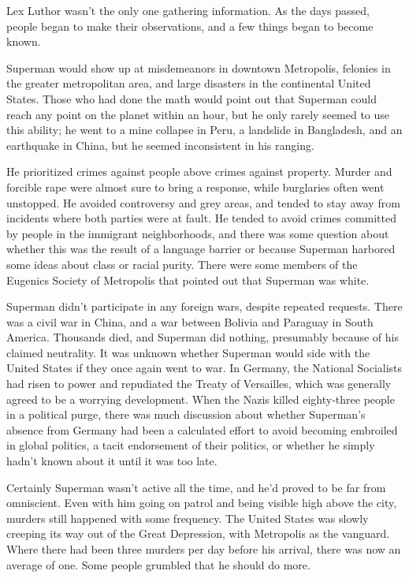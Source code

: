 \documentclass[ebook,12pt]{memoir}
\begin{document}
Lex Luthor wasn't the only one gathering information. As the days
passed, people began to make their observations, and a few things began
to become known.

Superman would show up at misdemeanors in downtown Metropolis, felonies
in the greater metropolitan area, and large disasters in the continental
United States. Those who had done the math would point out that Superman
could reach any point on the planet within an hour, but he only rarely
seemed to use this ability; he went to a mine collapse in Peru, a
landslide in Bangladesh, and an earthquake in China, but he seemed
inconsistent in his ranging.

He prioritized crimes against people above crimes against property.
Murder and forcible rape were almost sure to bring a response, while
burglaries often went unstopped. He avoided controversy and grey areas,
and tended to stay away from incidents where both parties were at fault.
He tended to avoid crimes committed by people in the immigrant
neighborhoods, and there was some question about whether this was the
result of a language barrier or because Superman harbored some ideas
about class or racial purity. There were some members of the Eugenics
Society of Metropolis that pointed out that Superman was white.

Superman didn't participate in any foreign wars, despite repeated
requests. There was a civil war in China, and a war between Bolivia and
Paraguay in South America. Thousands died, and Superman did nothing,
presumably because of his claimed neutrality. It was unknown whether
Superman would side with the United States if they once again went to
war. In Germany, the National Socialists had risen to power and
repudiated the Treaty of Versailles, which was generally agreed to be a
worrying development. When the Nazis killed eighty‐three people in a
political purge, there was much discussion about whether Superman's
absence from Germany had been a calculated effort to avoid becoming
embroiled in global politics, a tacit endorsement of their politics, or
whether he simply hadn't known about it until it was too late.

Certainly Superman wasn't active all the time, and he'd proved to be far
from omniscient. Even with him going on patrol and being visible high
above the city, murders still happened with some frequency. The United
States was slowly creeping its way out of the Great Depression, with
Metropolis as the vanguard. Where there had been three murders per day
before his arrival, there was now an average of one. Some people
grumbled that he should do more.
\end{document}

